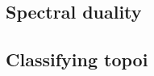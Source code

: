 \subsection{Spectral duality}%
\label{sub:spectral_duality}

\subsection{Classifying topoi}%
\label{sub:classifying_topoi}

